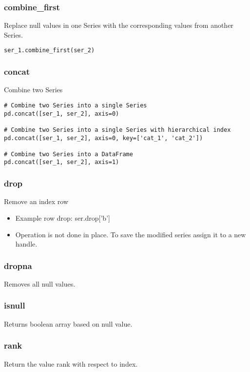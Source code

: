 \subsubsection{combine\_first}
Replace null values in one Series with the corresponding values from another
Series.
\begin{lstlisting}
ser_1.combine_first(ser_2)
\end{lstlisting}

\subsubsection{concat}
Combine two Series
\begin{lstlisting}
# Combine two Series into a single Series
pd.concat([ser_1, ser_2], axis=0)

# Combine two Series into a single Series with hierarchical index
pd.concat([ser_1, ser_2], axis=0, key=['cat_1', 'cat_2'])

# Combine two Series into a DataFrame
pd.concat([ser_1, ser_2], axis=1)
\end{lstlisting}

\subsubsection{drop}
Remove an index row
  \begin{itemize}

    \item Example row drop: ser.drop['b']

    \item Operation is not done in place.  To save the modified series
      assign it to a new handle.
  \end{itemize}

\subsubsection{dropna}
Removes all null values.

\subsubsection{isnull}
Returns boolean array based on null value.

\subsubsection{rank}
Return the value rank with respect to index.

